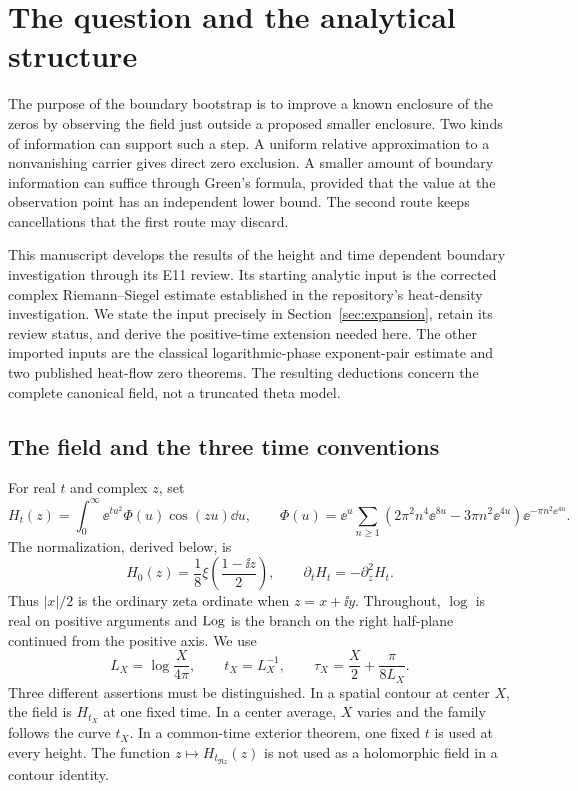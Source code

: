 \section{The question and the analytical structure}\label{sec:framework}

The purpose of the boundary bootstrap is to improve a known enclosure
of the zeros by observing the field just outside a proposed smaller
enclosure. Two kinds of information can support such a step. A uniform
relative approximation to a nonvanishing carrier gives direct zero
exclusion. A smaller amount of boundary information can suffice through
Green's formula, provided that the value at the observation point has an
independent lower bound. The second route keeps cancellations that the
first route may discard.

This manuscript develops the results of the height and time dependent
boundary investigation through its E11 review. Its starting analytic
input is the corrected complex Riemann--Siegel estimate established in
the repository's heat-density investigation. We state the input precisely
in Section~\ref{sec:expansion}, retain its review status, and derive the
positive-time extension needed here. The other imported inputs are the
classical logarithmic-phase exponent-pair estimate and two published
heat-flow zero theorems. The resulting deductions concern the complete
canonical field, not a truncated theta model.

\subsection{The field and the three time conventions}

For real $t$ and complex $z$, set
\begin{equation}\label{eq:canonical}
 H_t(z)=\int_0^\infty \ee^{tu^2}\Phi(u)\cos(zu)\dd u,
 \qquad
 \Phi(u)=\ee^u\sum_{n\ge1}
 (2\pi^2n^4\ee^{8u}-3\pi n^2\ee^{4u})\ee^{-\pi n^2\ee^{4u}}.
\end{equation}
The normalization, derived below, is
\begin{equation}\label{eq:normalization}
 H_0(z)=\frac18\xi\left(\frac{1-\ii z}{2}\right),\qquad
 \partial_tH_t=-\partial_z^2H_t.
\end{equation}
Thus $|x|/2$ is the ordinary zeta ordinate when $z=x+\ii y$.
Throughout, $\log$ is real on positive arguments and $\operatorname{Log}$ is the
branch on the right half-plane continued from the positive axis.
We use
\[
 L_X=\log\frac{X}{4\pi},\qquad t_X=L_X^{-1},\qquad
 \tau_X=\frac X2+\frac{\pi}{8L_X}.
\]
Three different assertions must be distinguished. In a spatial contour
at center $X$, the field is $H_{t_X}$ at one fixed time. In a center
average, $X$ varies and the family follows the curve $t_X$. In a
common-time exterior theorem, one fixed $t$ is used at every height.
The function $z\mapsto H_{t_{\Re z}}(z)$ is not used as a holomorphic
field in a contour identity.

